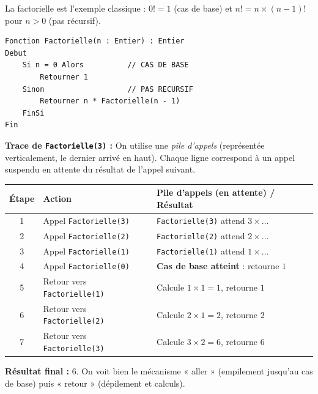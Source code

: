 \documentclass[11pt]{article}
\begin{document}
\begin{exemplebox}[Factorielle : $n! = n \times (n-1)!$]
La factorielle est l'exemple classique : $0! = 1$ (cas de base) et $n! = n \times (n-1)!$ pour $n > 0$ (pas récursif).

\begin{lstlisting}
Fonction Factorielle(n : Entier) : Entier
Debut
    Si n = 0 Alors          // CAS DE BASE
        Retourner 1
    Sinon                   // PAS RECURSIF
        Retourner n * Factorielle(n - 1)
    FinSi
Fin
\end{lstlisting}

\textbf{Trace de \texttt{Factorielle(3)} :} On utilise une \emph{pile d'appels} (représentée verticalement, le dernier arrivé en haut). Chaque ligne correspond à un appel suspendu en attente du résultat de l'appel suivant.

\begin{center}
\begin{tabularx}{\linewidth}{|c|l|X|}
\hline
\rowcolor{popblueL} Étape & Action & Pile d'appels (en attente) / Résultat \\
\hline
1 & Appel \texttt{Factorielle(3)} & \texttt{Factorielle(3)} attend $3 \times \dots$ \\
\hline
2 & Appel \texttt{Factorielle(2)} & \texttt{Factorielle(2)} attend $2 \times \dots$ \\
\hline
3 & Appel \texttt{Factorielle(1)} & \texttt{Factorielle(1)} attend $1 \times \dots$ \\
\hline
4 & Appel \texttt{Factorielle(0)} & \textbf{Cas de base atteint} : retourne $1$ \\
\hline
5 & Retour vers \texttt{Factorielle(1)} & Calcule $1 \times 1 = 1$, retourne $1$ \\
\hline
6 & Retour vers \texttt{Factorielle(2)} & Calcule $2 \times 1 = 2$, retourne $2$ \\
\hline
7 & Retour vers \texttt{Factorielle(3)} & Calcule $3 \times 2 = 6$, retourne $6$ \\
\hline
\end{tabularx}
\end{center}

\textbf{Résultat final :} $6$. On voit bien le mécanisme « aller » (empilement jusqu'au cas de base) puis « retour » (dépilement et calculs).
\end{exemplebox}
\end{document}
